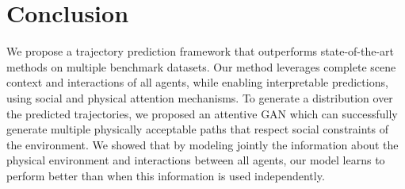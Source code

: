 \documentclass[10pt,twocolumn,letterpaper]{article}
\begin{document}
\section{Conclusion}
We propose a trajectory prediction framework that outperforms state-of-the-art methods on multiple benchmark datasets. Our method leverages complete scene context and interactions of all agents, while enabling interpretable predictions, using social and physical attention mechanisms. To generate a distribution over the predicted trajectories, we proposed an attentive GAN which can successfully generate multiple physically acceptable paths that respect social constraints of the environment. We showed that by modeling jointly the information about the physical environment and interactions between all agents, our model learns to perform better than when this information is used independently.

\pagebreak

{\small


}
\end{document}
